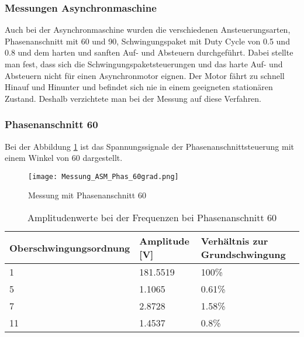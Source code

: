 \subsubsection{Messungen Asynchronmaschine}

Auch bei der Asynchronmaschine wurden die verschiedenen Ansteuerungsarten, Phasenanschnitt mit 60\textdegree \hspace{0.02cm} und 90\textdegree \hspace{0.02cm}, Schwingungspaket mit Duty Cycle von 0.5 und 0.8 und dem harten und sanften Auf- und Absteuern durchgeführt. Dabei stellte man fest, dass sich die Schwingungspaketsteuerungen und das harte Auf- und Absteuern nicht für einen Asynchronmotor eignen. Der Motor fährt zu schnell Hinauf und Hinunter und befindet sich nie in einem geeigneten stationären Zustand. Deshalb verzichtete man bei der Messung auf diese Verfahren.

\subsubsection*{Phasenanschnitt 60\textdegree}

Bei der Abbildung \ref{fig:Mess_ASM_Phas60} ist das Spannungssignale der Phasenanschnittsteuerung mit einem Winkel von 60\textdegree\hspace{0.02cm} dargestellt.

\begin{figure}[ht!]
	\centering
	\texttt{[image: Messung\_ASM\_Phas\_60grad.png]}	
	\caption{Messung mit Phasenanschnitt 60\textdegree}\label{fig:Mess_ASM_Phas60}
\end{figure}


\newpage
\begin{table}[ht!]
	\centering
	\begin{tabular}{|l|l|l|}
		\hline
		Oberschwingungsordnung & Amplitude {[}V{]} & Verhältnis zur Grundschwingung \\ \hline
		1                      & 181.5519          & 100\%                          \\ \hline
		5                      & 1.1065            & 0.61\%                         \\ \hline
		7                      & 2.8728            & 1.58\%                         \\ \hline
		11                     & 1.4537            & 0.8\%                          \\ \hline
	\end{tabular}
\caption{Amplitudenwerte bei der Frequenzen bei Phasenanschnitt 60\textdegree}\label{tab:Mess_Spannung_ASM_Phas60}
\end{table}

